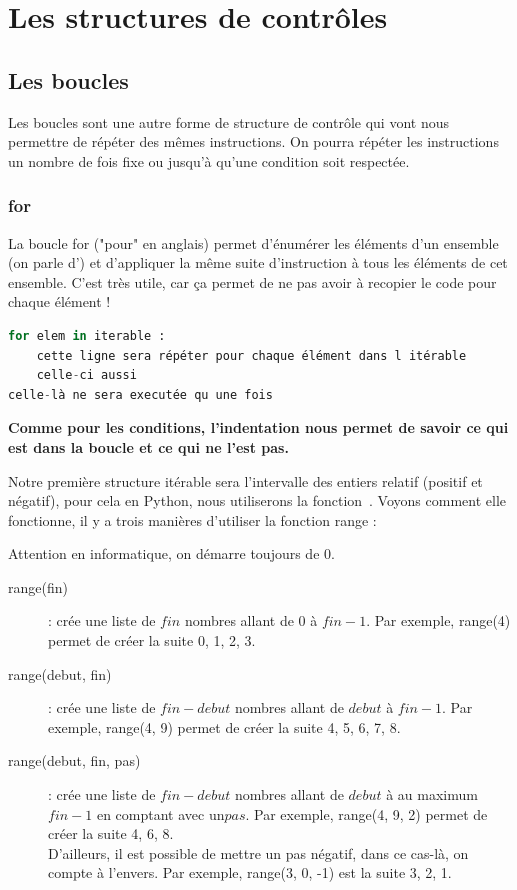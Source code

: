 \renewcommand{\chaptername}{\phantom{Chapitre}}\renewcommand{\thechapter}{}
\chapter{Les structures de contrôles}
\renewcommand{\thesection}{\arabic{section}}
\section{Les boucles}
Les boucles sont une autre forme de structure de contrôle qui vont nous permettre de répéter des mêmes instructions.
On pourra répéter les instructions un nombre de fois fixe ou jusqu'à qu'une condition soit respectée.

\subsection{for}
La boucle for ("pour" en anglais) permet d'énumérer les éléments d'un ensemble (on parle d') et d'appliquer la même suite d'instruction à tous les éléments de cet ensemble.
C'est très utile, car ça permet de ne pas avoir à recopier le code pour chaque élément !

\begin{lstlisting}[style=pythonstyle, language=python]
for elem in iterable :
    cette ligne sera répéter pour chaque élément dans l itérable
    celle-ci aussi
celle-là ne sera executée qu une fois
\end{lstlisting}
\begin{center}\textbf{Comme pour les conditions, l'indentation nous permet de savoir ce qui est dans la boucle et ce qui ne l'est pas.}\end{center}

Notre première structure itérable sera l'intervalle des entiers relatif (positif et négatif), pour cela en Python, nous utiliserons la fonction~. Voyons comment elle fonctionne, il y a trois manières d'utiliser la fonction range :
    \begin{center}
        Attention en informatique, on démarre toujours de 0.
    \end{center}
\begin{description}
    \item[range(fin)]: crée une liste de $fin$ nombres allant de $0$ à $fin-1$. Par exemple, range(4) permet de créer la suite 0, 1, 2, 3.
    \item[range(debut, fin)]: crée une liste de $fin - debut$ nombres allant de $debut$ à $fin-1$. Par exemple, range(4, 9) permet de créer la suite 4, 5, 6, 7, 8.
    \item[range(debut, fin, pas)]: crée une liste de $fin - debut$ nombres allant de $debut$ à au maximum $fin-1$ en comptant avec un$pas$. Par exemple, range(4, 9, 2) permet de créer la suite 4, 6, 8.\\
    D'ailleurs, il est possible de mettre un pas négatif, dans ce cas-là, on compte à l'envers. Par exemple, range(3, 0, -1) est la suite 3, 2, 1.
\end{description}

